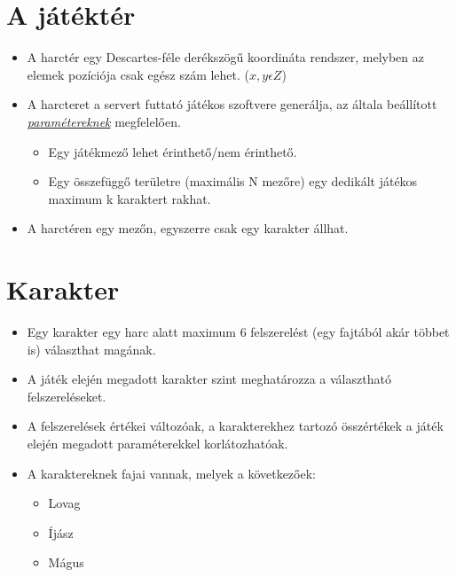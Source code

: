 \section{A játéktér}
\begin{itemize}
	\item A harctér egy Descartes-féle derékszögű koordináta rendszer, melyben az elemek pozíciója csak egész szám lehet. ($x,y \epsilon Z  $)
	\item A harcteret a servert futtató játékos szoftvere generálja, az általa beállított \hyperref[StartParams]{\textit{paramétereknek}} megfelelően.
	\begin{itemize}
		\item Egy játékmező lehet érinthető/nem érinthető.
		\item Egy összefüggő területre (maximális N mezőre) egy dedikált játékos maximum k karaktert rakhat.
	\end{itemize}
	\item A harctéren egy mezőn, egyszerre csak egy karakter állhat.
\end{itemize}


\section{Karakter}
\begin{itemize}
	\item Egy karakter egy harc alatt maximum 6 felszerelést (egy fajtából akár többet is) választhat magának.
	\item A játék elején megadott karakter szint meghatározza a választható felszereléseket.
	\item A felszerelések értékei változóak, a karakterekhez tartozó összértékek a játék elején megadott paraméterekkel korlátozhatóak.
	\item A karaktereknek fajai vannak, melyek a következőek:	
	\begin{itemize}
		\item Lovag
		\item Íjász
		\item Mágus
	\end{itemize} 
\end{itemize}




